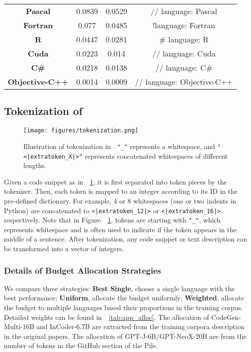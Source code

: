 \begin{table}[htbp]
{{\begin{tabular}{cccc}
    \textbf{Pascal} & 0.0839 & 0.0529 & // language: Pascal \\
    \textbf{Fortran} & 0.077 & 0.0485 & !language: Fortran \\
    \textbf{R} & 0.0447 & 0.0281 & \# language: R \\
    \textbf{Cuda} & 0.0223 & 0.014 & // language: Cuda \\
    \textbf{C\#} & 0.0218 & 0.0138 & // language: C\# \\
    \textbf{Objective-C++} & 0.0014 & 0.0009 & // language: Objective-C++ \\
    \bottomrule
    \end{tabular}}
    }
\label{tab:dataset-comp}
\end{table}

\subsection{Tokenization of \name}
\label{app:tokenization}

\begin{figure}[htbp]
    \centering
    \texttt{[image: figures/tokenization.png]}
    \caption{Illustration of tokenization in \name. \texttt{"\_"} represents a whitespace, and \texttt{"<|extratoken\_X|>"} represents concatenated whitespaces of different lengths.}
    \label{fig:tokenization}
\end{figure}

Given a code snippet as in~\figurename~\ref{fig:tokenization}, it is first separated into token pieces by the tokenizer.
Then, each token is mapped to an integer according to its ID in the pre-defined dictionary.
For example, 4 or 8 whitespaces (one or two indents in Python) are concatenated to \texttt{<|extratoken\_12|>} or \texttt{<|extratoken\_16|>}, respectively.
Note that in Figure~\figurename~\ref{fig:tokenization}, tokens are starting with \texttt{"\_"}, which represents whitespace and is often used to indicate if the token appears in the middle of a sentence. 
After tokenization, any code snippet or text description can be transformed into a vector of integers.

\subsubsection{Details of Budget Allocation Strategies}

We compare three strategies: \textbf{Best Single}, choose a single language with the best performance; \textbf{Uniform}, allocate the budget uniformly; \textbf{Weighted}, allocate the budget to multiple languages based their proportions in the training corpus. 
Detailed weights can be found in~\tablename~\ref{tab:app_alloc}.
The allocation of CodeGen-Multi-16B and InCoder-6.7B are extracted from the training corpora description in the original papers. 
The allocation of GPT-J-6B/GPT-NeoX-20B are from the number of tokens in the GitHub section of the Pile. 

